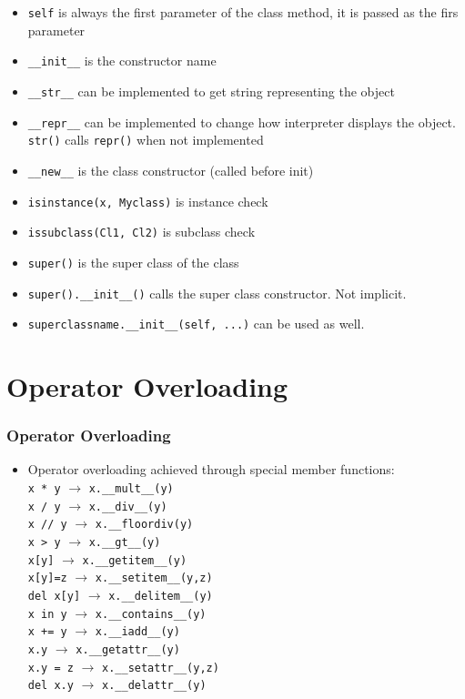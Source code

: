 \documentclass[trans,compress,xcolor=table]{beamer}
\begin{document}
\begin{frame}
\begin{itemize}
\item \lstinline!self! is always the first parameter of the class method, it is
     passed as the firs parameter
\item \lstinline!__init__! is the constructor name
\item \lstinline!__str__! can be implemented to get string representing the object
\item \lstinline!__repr__! can be implemented to change how interpreter displays the object. 
	\lstinline!str()! calls \lstinline!repr()! when not implemented
\item \lstinline!__new__! is the class constructor (called before init)
\item \lstinline!isinstance(x, Myclass)! is instance check
\item \lstinline!issubclass(Cl1, Cl2)! is subclass check
\item \lstinline!super()! is the super class of the class
\item \lstinline!super().__init__()! calls the super class constructor. Not implicit.
\item \lstinline!superclassname.__init__(self, ...)! can be used as well.
\end{itemize}
\end{frame}

\section{Operator Overloading}
\begin{frame}
\frametitle{Operator Overloading}
\begin{itemize}
\item Operator overloading achieved through special
	member functions:\\
\lstinline'x * y' $\rightarrow$ \lstinline!x.__mult__(y)!\\
\lstinline'x / y' $\rightarrow$ \lstinline!x.__div__(y)!\\
\lstinline'x // y' $\rightarrow$ \lstinline!x.__floordiv(y)!\\
\lstinline'x > y' $\rightarrow$ \lstinline!x.__gt__(y)!\\
\lstinline'x[y]' $\rightarrow$ \lstinline!x.__getitem__(y)!\\
\lstinline'x[y]=z' $\rightarrow$ \lstinline!x.__setitem__(y,z)!\\
\lstinline'del x[y]' $\rightarrow$ \lstinline!x.__delitem__(y)!\\
\lstinline'x in y' $\rightarrow$ \lstinline!x.__contains__(y)!\\
\lstinline'x += y' $\rightarrow$ \lstinline!x.__iadd__(y)!\\
\lstinline'x.y' $\rightarrow$ \lstinline!x.__getattr__(y)!\\
\lstinline'x.y = z' $\rightarrow$ \lstinline!x.__setattr__(y,z)!\\
\lstinline'del x.y' $\rightarrow$ \lstinline!x.__delattr__(y)!\\
\end{itemize}

\end{frame}
\end{document}
